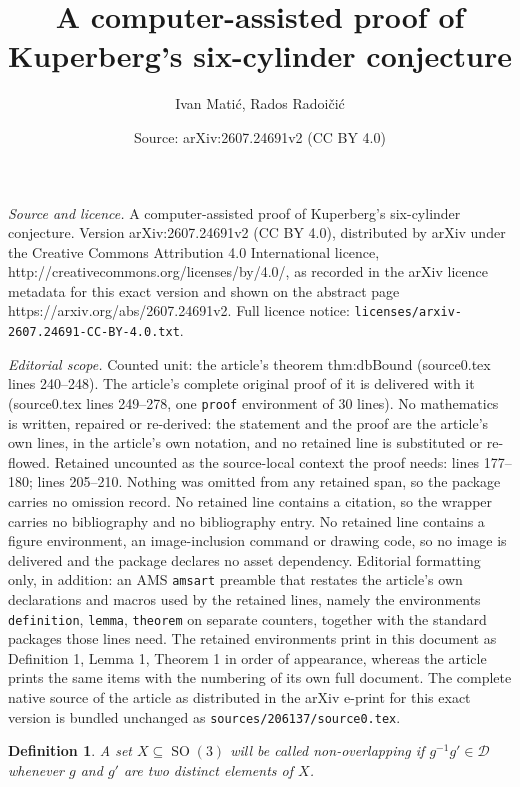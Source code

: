 \documentclass[10pt,a4paper]{amsart}
\title{A computer-assisted proof of Kuperberg's six-cylinder conjecture}
\author{Ivan Mati\'c, Rados Radoi\v{c}i\'c}
\date{Source: arXiv:2607.24691v2 (CC BY 4.0)}
\newtheorem{definition}{Definition}
\newcommand{\Dom}{\mathcal{D}}
\DeclareMathOperator{\SO}{SO}
\begin{document}
\maketitle

\noindent\emph{Source and licence.} A computer-assisted proof of Kuperberg's six-cylinder conjecture. Version arXiv:2607.24691v2 (CC BY 4.0), distributed by arXiv under the Creative Commons Attribution 4.0 International licence, http://creativecommons.org/licenses/by/4.0/, as recorded in the arXiv licence metadata for this exact version and shown on the abstract page https://arxiv.org/abs/2607.24691v2. Full licence notice: \texttt{licenses/arxiv-2607.24691-CC-BY-4.0.txt}.\par\smallskip

\noindent\textit{Editorial scope.} Counted unit: the article's theorem thm:dbBound (source0.tex lines 240--248). The article's complete original proof of it is delivered with it (source0.tex lines 249--278, one \texttt{proof} environment of 30 lines). No mathematics is written, repaired or re-derived: the statement and the proof are the article's own lines, in the article's own notation, and no retained line is substituted or re-flowed.  Retained uncounted as the source-local context the proof needs: lines 177--180; lines 205--210.  Nothing was omitted from any retained span, so the package carries no omission record.  No retained line contains a citation, so the wrapper carries no bibliography and no bibliography entry.  No retained line contains a figure environment, an image-inclusion command or drawing code, so no image is delivered and the package declares no asset dependency.  Editorial formatting only, in addition: an AMS \texttt{amsart} preamble that restates the article's own declarations and macros used by the retained lines, namely the environments \texttt{definition}, \texttt{lemma}, \texttt{theorem} on separate counters, together with the standard packages those lines need.  The retained environments print in this document as Definition 1, Lemma 1, Theorem 1 in order of appearance, whereas the article prints the same items with the numbering of its own full document.  The complete native source of the article as distributed in the arXiv e-print for this exact version is bundled unchanged as \texttt{sources/206137/source0.tex}.
\begin{definition}\label{def:nonOverlappingX}
A set $X\subseteq \SO(3)$ will be called \emph{non-overlapping} if
$g^{-1}g'\in\Dom$ whenever $g$ and $g'$ are two distinct elements of $X$.
\end{definition}
\end{document}
